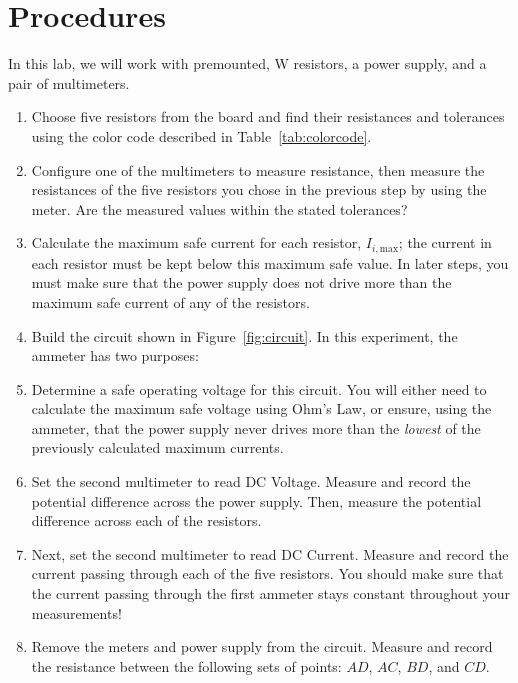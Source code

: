 \documentclass[12pt]{article}
\begin{document}
\section{Procedures}
\label{sec:procedures}

In this lab, we will work with premounted, \unit[1]{W} resistors, a
power supply, and a pair of multimeters.  

\begin{enumerate}
\item Choose five resistors from the board and find their resistances
  and tolerances using the color code described in
  Table~\ref{tab:colorcode}.
\item Configure one of the multimeters to measure resistance, then
  measure the resistances of the five resistors you chose in the
  previous step by using the meter.  Are the measured values within
  the stated tolerances?
\item Calculate the maximum safe current for each resistor,
  $I_{i,\mathrm{max}}$; the current in each resistor must be kept
  below this maximum safe value.  In later steps, you must make sure
  that the power supply does not drive more than the maximum safe
  current of any of the resistors.
\item Build the circuit shown in Figure~\ref{fig:circuit}.  In this
  experiment, the ammeter has two purposes:
\item Determine a safe operating voltage for this circuit.  You will
  either need to calculate the maximum safe voltage using Ohm's Law,
  or ensure, using the ammeter, that the power supply never drives
  more than the \textit{lowest} of the previously calculated maximum
  currents.
\item Set the second multimeter to read DC Voltage.  Measure and
  record the potential difference across the power supply.  Then,
  measure the potential difference across each of the resistors.
\item Next, set the second multimeter to read DC Current.  Measure and
  record the current passing through each of the five resistors.  You
  should make sure that the current passing through the first ammeter
  stays constant throughout your measurements!
\item Remove the meters and power supply from the circuit.  Measure
  and record the resistance between the following sets of points:
  $AD$, $AC$, $BD$, and $CD$.
\end{enumerate}
\end{document}

